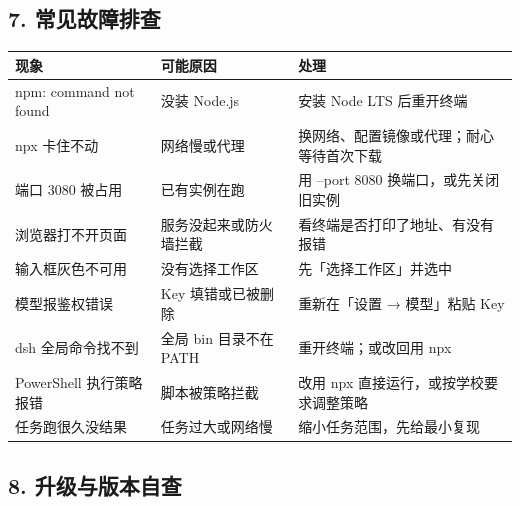 \subsection{7. 常见故障排查}\label{ux5e38ux89c1ux6545ux969cux6392ux67e5}

{\def\LTcaptype{none} %
\begin{longtable}[]{@{}
  >{\raggedright\arraybackslash}p{}
  >{\raggedright\arraybackslash}p{}
  >{\raggedright\arraybackslash}p{}@{}}
\toprule\noalign{}
\begin{minipage}[b]{\linewidth}\raggedright
现象
\end{minipage} & \begin{minipage}[b]{\linewidth}\raggedright
可能原因
\end{minipage} & \begin{minipage}[b]{\linewidth}\raggedright
处理
\end{minipage} \\
\midrule\noalign{}
\endhead
\bottomrule\noalign{}
\endlastfoot
npm: command not found & 没装 Node.js & 安装 Node LTS 后重开终端 \\
npx 卡住不动 & 网络慢或代理 &
换网络、配置镜像或代理；耐心等待首次下载 \\
端口 3080 被占用 & 已有实例在跑 & 用 --port 8080
换端口，或先关闭旧实例 \\
浏览器打不开页面 & 服务没起来或防火墙拦截 &
看终端是否打印了地址、有没有报错 \\
输入框灰色不可用 & 没有选择工作区 & 先「选择工作区」并选中 \\
模型报鉴权错误 & Key 填错或已被删除 & 重新在「设置 → 模型」粘贴 Key \\
dsh 全局命令找不到 & 全局 bin 目录不在 PATH & 重开终端；或改回用 npx \\
PowerShell 执行策略报错 & 脚本被策略拦截 & 改用 npx
直接运行，或按学校要求调整策略 \\
任务跑很久没结果 & 任务过大或网络慢 & 缩小任务范围，先给最小复现 \\
\end{longtable}
}

\subsection{8.
升级与版本自查}\label{ux5347ux7ea7ux4e0eux7248ux672cux81eaux67e5}

\begin{Shaded}
\begin{Highlighting}[]
                             
\end{Highlighting}
\end{Shaded}

